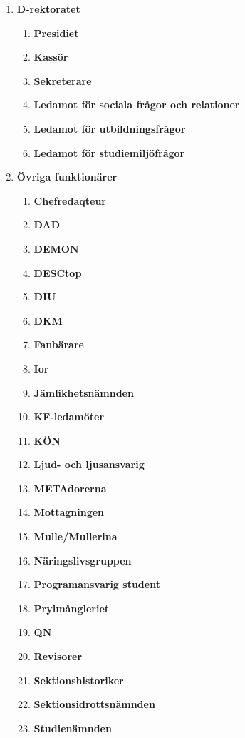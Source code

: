 \documentclass{protokoll}
\begin{document}
  \begin{enumerate}
    \item \textbf{D-rektoratet}
      \begin{enumerate}
        \item \textbf{Presidiet}
        \item \textbf{Kassör}
        \item \textbf{Sekreterare}
        \item \textbf{Ledamot för sociala frågor och relationer}
        \item \textbf{Ledamot för utbildningsfrågor}
        \item \textbf{Ledamot för studiemiljöfrågor}
      \end{enumerate}
    \item \textbf{Övriga funktionärer}
      \begin{enumerate}
      	\item \textbf{Chefredaqteur}
      	\item \textbf{DAD}
        \item \textbf{DEMON}
        \item \textbf{DESCtop}
        \item \textbf{DIU}
        \item \textbf{DKM}
        \item \textbf{Fanbärare}
        \item \textbf{Ior}
        \item \textbf{Jämlikhetsnämnden}
        \item \textbf{KF-ledamöter}
        \item \textbf{KÖN}
  		\item \textbf{Ljud- och ljusansvarig}
        \item \textbf{METAdorerna}
        \item \textbf{Mottagningen}
  		\item \textbf{Mulle/Mullerina}
        \item \textbf{Näringslivsgruppen}
        \item \textbf{Programansvarig student}
        \item \textbf{Prylmångleriet}
        \item \textbf{QN}
        \item \textbf{Revisorer}
        \item \textbf{Sektionshistoriker}
        \item \textbf{Sektionsidrottsnämnden}
        \item \textbf{Studienämnden}

\end{enumerate}
\end{enumerate}
\end{document}
